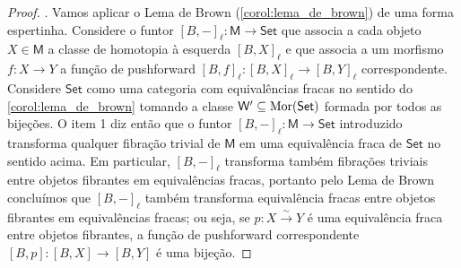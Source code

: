 \begin{proof}
  . Vamos aplicar o Lema de Brown (\cref{corol:lema_de_brown}) de uma forma espertinha.
  Considere o funtor $[B,-]_{\ell}: \mathsf{M} \to \mathsf{Set}$ que associa a cada objeto $X \in \mathsf{M}$ a classe de homotopia à esquerda $[B,X]_{\ell}$ e que associa a um morfismo $f: X \to Y$ a função de pushforward $[B,f]_{\ell}: [B,X]_{\ell} \to [B,Y]_{\ell}$ correspondente.
  Considere $\mathsf{Set}$ como uma categoria com equivalências fracas no sentido do \cref{corol:lema_de_brown} tomando a classe $\mathsf{W}' \subseteq \mathrm{Mor}(\mathsf{Set})$ formada por todos as bijeções.
  O item 1 diz então que o funtor $[B,-]_{\ell}: \mathsf{M} \to \mathsf{Set}$ introduzido transforma qualquer fibração trivial de $\mathsf{M}$ em uma equivalência fraca de $\mathsf{Set}$ no sentido acima.
  Em particular, $[B,-]_{\ell}$ transforma também fibrações triviais entre objetos fibrantes em equivalências fracas, portanto pelo Lema de Brown concluímos que $[B,-]_{\ell}$ também transforma equivalência fracas entre objetos fibrantes em equivalências fracas; ou seja, se $p: X \overset{\sim}{\to} Y$ é uma equivalência fraca entre objetos fibrantes, a função de pushforward correspondente $[B,p]: [B,X] \to [B,Y]$ é uma bijeção.
\end{proof}

